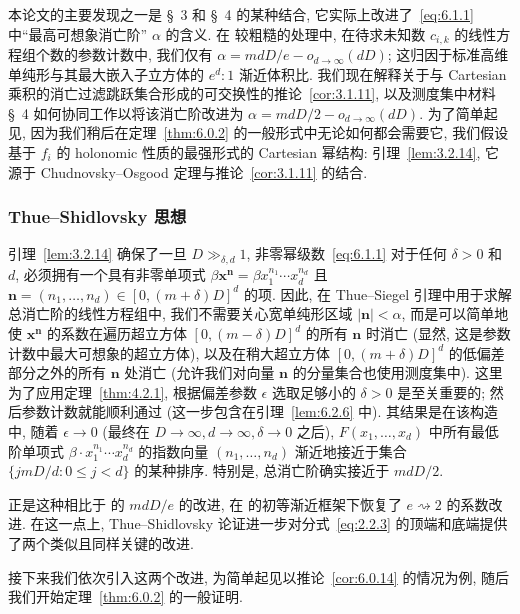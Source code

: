 本论文的主要发现之一是 \S~3 和 \S~4 的某种结合, 它实际上改进了~\eqref{eq:6.1.1} 中``最高可想象消亡阶'' $\alpha$ 的含义.
在 \cite[§ 2]{CDT21} 较粗糙的处理中, 在待求未知数 $c_{i,k}$ 的线性方程组个数的参数计数中, 我们仅有 $\alpha = mdD/e - o_{d\to\infty}(dD)$; 这归因于标准高维单纯形与其最大嵌入子立方体的 $e^d:1$ 渐近体积比.
我们现在解释关于与 Cartesian 乘积的消亡过滤跳跃集合形成的可交换性的推论~\ref{cor:3.1.11}, 以及测度集中材料 \S~4 如何协同工作以将该消亡阶改进为 $\alpha = mdD/2 - o_{d\to\infty}(dD)$.
为了简单起见, 因为我们稍后在定理~\ref{thm:6.0.2} 的一般形式中无论如何都会需要它, 我们假设基于 $f_i$ 的 holonomic 性质的最强形式的 Cartesian 幂结构: 引理~\ref{lem:3.2.14}, 它源于 Chudnovsky--Osgood 定理与推论~\ref{cor:3.1.11} 的结合.

\subsubsection{Thue--Shidlovsky 思想}\label{sec:6.1.2}

引理~\ref{lem:3.2.14} 确保了一旦 $D \gg_{\delta,d} 1$, 非零幂级数~\eqref{eq:6.1.1} 对于任何 $\delta > 0$ 和 $d$, 必须拥有一个具有非零单项式 $\beta \mathbf{x}^{\mathbf{n}} = \beta x_1^{n_1} \cdots x_d^{n_d}$ 且 $\mathbf{n} = (n_1, \dots, n_d) \in [0, (m+\delta)D]^d$ 的项.
因此, 在 Thue--Siegel 引理中用于求解总消亡阶的线性方程组中, 我们不需要关心宽单纯形区域 $|\mathbf{n}| < \alpha$, 而是可以简单地使 $\mathbf{x}^{\mathbf{n}}$ 的系数在遍历超立方体 $[0, (m-\delta)D]^d$ 的所有 $\mathbf{n}$ 时消亡 (显然, 这是参数计数中最大可想象的超立方体), 以及在稍大超立方体 $[0, (m+\delta)D]^d$ 的低偏差部分之外的所有 $\mathbf{n}$ 处消亡 (允许我们对向量 $\mathbf{n}$ 的分量集合也使用测度集中).
这里为了应用定理~\ref{thm:4.2.1}, 根据偏差参数 $\epsilon$ 选取足够小的 $\delta > 0$ 是至关重要的; 然后参数计数就能顺利通过 (这一步包含在引理~\ref{lem:6.2.6} 中).
其结果是在该构造中, 随着 $\epsilon \to 0$ (最终在 $D \to \infty, d \to \infty, \delta \to 0$ 之后), $F(x_1,\ldots,x_d)$ 中所有最低阶单项式 $\beta \cdot x_1^{n_1} \cdots x_d^{n_d}$ 的指数向量 $(n_1,\ldots,n_d)$ 渐近地接近于集合 $\{jmD/d: 0 \le j < d\}$ 的某种排序.
特别是, 总消亡阶确实接近于 $mdD/2$.

正是这种相比于 \cite[Lemma 2.1.2]{CDT21} 的 $mdD/e$ 的改进, 在 \cite[§ 2]{CDT21} 的初等渐近框架下恢复了 $e \rightsquigarrow 2$ 的系数改进.
在这一点上, Thue--Shidlovsky 论证进一步对分式~\eqref{eq:2.2.3} 的顶端和底端提供了两个类似且同样关键的改进.

接下来我们依次引入这两个改进, 为简单起见以推论~\ref{cor:6.0.14} 的情况为例, 随后我们开始定理~\ref{thm:6.0.2} 的一般证明.


